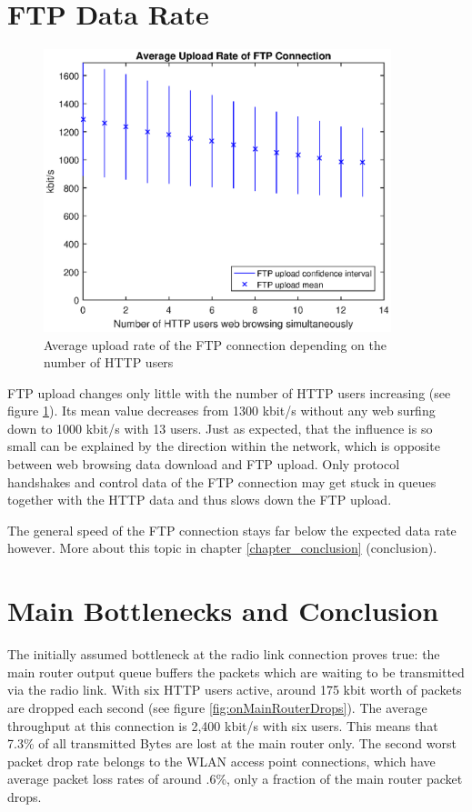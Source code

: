 \documentclass[a4paper,10pt]{book}\usepackage{graphicx}
\begin{document}
\section{FTP Data Rate}
\begin{figure}[!ht]
  \begin{center}
    \includegraphics[width=0.9\textwidth]{on_ftp_upload.eps}
    \caption{Average upload rate of the FTP connection depending on the number of HTTP users}
    \label{fig:onFtpUpload}
    \end{center}
\end{figure}

FTP upload changes only little with the number of HTTP users increasing (see figure \ref{fig:onFtpUpload}). Its mean value decreases from 1300 kbit/s without any web surfing down to 1000 kbit/s with 13 users. Just as expected, that the influence is so small can be explained by the direction within the network, which is opposite between web browsing data download and FTP upload. Only protocol handshakes and control data of the FTP connection may get stuck in queues together with the HTTP data and thus slows down the FTP upload.

The general speed of the FTP connection stays far below the expected data rate however. More about this topic in chapter \ref{chapter_conclusion} (conclusion).

\section{Main Bottlenecks and Conclusion}

The initially assumed bottleneck at the radio link connection proves true: the main router output queue buffers the packets which are waiting to be transmitted via the radio link. With six HTTP users active, around 175 kbit worth of packets are dropped each second (see figure \ref{fig:onMainRouterDrops}). The average throughput at this connection is 2,400 kbit/s with six users. This means that 7.3\% of all transmitted Bytes are lost at the main router only. The second worst packet drop rate belongs to the WLAN access point connections, which have average packet loss rates of around .6\%, only a fraction of the main router packet drops.
\end{document}
